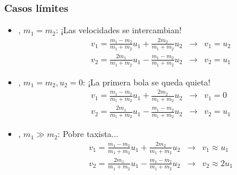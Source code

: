 \documentclass[xetex,mathserif,serif,10pt]{beamer}
\newcommand{\bblock}[1]{{\color{chart12}{#1}}}
\begin{document}
\begin{frame}
\frametitle{Casos límites}
\begin{itemize}
\item \bblock{autos chocadores}, $m_1=m_2$: \alert{¡Las velocidades se intercambian!}
\begin{eqnarray*}
    v_1 = \frac{m_1 - m_2}{m_1 + m_2} u_1 + \frac{2 m_2}{m_1+m_2} u_2 &\to& v_1 = u_2 \\
    v_2 = \frac{2 m_1}{m_1+m_2} u_1 - \frac{m_1-m_2}{m_1+m_2} u_2 &\to& v_2 = u_1
\end{eqnarray*}
\vspace{-1em}

\item \bblock{Billar}, $m_1=m_2, u_2=0$: \alert{¡La primera bola se queda quieta!}
\begin{eqnarray*}
    v_1 = \frac{m_1 - m_2}{m_1 + m_2} u_1 + \frac{2 m_2}{m_1+m_2} u_2 &\to& v_1 = 0 \\
    v_2 = \frac{2 m_1}{m_1+m_2} u_1 - \frac{m_1-m_2}{m_1+m_2} u_2 &\to& v_2 = u_1
\end{eqnarray*}
\vspace{-1em}

\item \bblock{Camión vs taxi, elástico}, $m_1 \gg m_2$: \alert{Pobre taxista...}
\begin{eqnarray*}
    v_1 = \frac{m_1 - m_2}{m_1 + m_2} u_1 + \frac{2 m_2}{m_1+m_2} u_2 &\to&  v_1 \approx u_1 \\
    v_2 = \frac{2 m_1}{m_1+m_2} u_1 - \frac{m_1-m_2}{m_1+m_2} u_2 &\to& v_2 \approx 2 u_1
\end{eqnarray*}
\vspace{-1em}
\end{itemize}
\end{frame}
\end{document}
